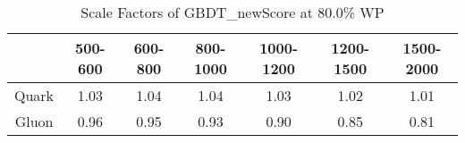 \begin{table}
\centering
\caption{Scale Factors of GBDT_newScore at 80.0\% WP}
\label{tab:GBDT_newScore_0.8_Gluon}
\begin{tabular}{ccccccc}
\toprule
{} &  500-600 &  600-800 &  800-1000 &  1000-1200 &  1200-1500 &  1500-2000 \\
\midrule
Quark &     1.03 &     1.04 &      1.04 &       1.03 &       1.02 &       1.01 \\
Gluon &     0.96 &     0.95 &      0.93 &       0.90 &       0.85 &       0.81 \\
\bottomrule
\end{tabular}
\end{table}
